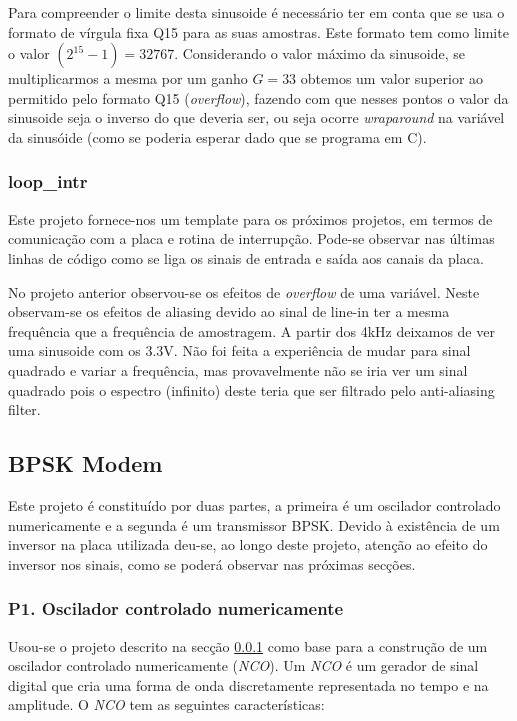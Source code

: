 \documentclass[11pt]{article}
\numberwithin{equation}{section}
\begin{document}
Para compreender o limite desta sinusoide é necessário ter em conta que se usa o formato de vírgula fixa Q15 para as suas amostras. Este formato tem como limite o valor $(2^{15}-1) = 32767$. Considerando o valor máximo da sinusoide, se multiplicarmos a mesma por um ganho $G=33$ obtemos um valor superior ao permitido pelo formato Q15 (\textit{overflow}), fazendo com que nesses pontos o valor da sinusoide seja o inverso do que deveria ser, ou seja ocorre \textit{wraparound} na variável da sinusóide (como se poderia esperar dado que se programa em C).

\subsubsection{loop\_intr}
\label{sec:loop}
Este projeto fornece-nos um template para os próximos projetos, em termos de comunicação com a placa e rotina de interrupção. Pode-se observar nas últimas linhas de código como se liga os sinais de entrada e saída aos canais da placa.

No projeto anterior observou-se os efeitos de \textit{overflow} de uma variável. Neste observam-se os efeitos de aliasing  devido ao sinal de line-in ter a mesma frequência que a frequência de amostragem. A partir dos 4kHz deixamos de ver uma sinusoide com os 3.3V. Não foi feita a experiência de mudar para sinal quadrado e variar a frequência, mas provavelmente não se iria ver um sinal quadrado pois o espectro (infinito) deste teria que ser filtrado pelo anti-aliasing filter. 

\subsection{BPSK Modem}
Este projeto é constituído por duas partes, a primeira é um oscilador controlado numericamente e a segunda é um transmissor BPSK. Devido à existência de um inversor na placa utilizada deu-se, ao longo deste projeto, atenção ao efeito do inversor nos sinais, como se poderá observar nas próximas secções.

\subsubsection{P1. Oscilador controlado numericamente}
\label{NCO}
Usou-se o projeto descrito na secção \ref{sec:loop} como base para a construção de um oscilador controlado numericamente (\textit{NCO}). Um \textit{NCO} é um gerador de sinal digital que cria uma forma de onda discretamente representada no tempo e na amplitude. O \textit{NCO} tem as seguintes características:
\end{document}
